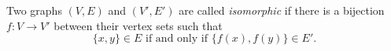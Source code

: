 

\setcounter{section}{1}
\setcounter{subsection}{3}
\setcounter{dfn}{2}

\begin{dfn}
Two graphs $(V, E)$ and $(V', E')$ are called \emph{isomorphic} if there is a bijection $f \colon V \to V'$
between their vertex sets such that
\[
\{x, y\} \in E \text{ if and only if } \{f(x), f(y)\} \in E'.
\]
\end{dfn}


